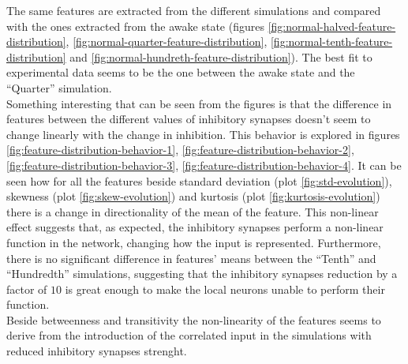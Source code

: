 The same features are extracted from the different simulations and compared with the ones extracted from the awake state (figures \ref{fig:normal-halved-feature-distribution}, \ref{fig:normal-quarter-feature-distribution}, \ref{fig:normal-tenth-feature-distribution} and \ref{fig:normal-hundreth-feature-distribution}).
The best fit to experimental data seems to be the one between the awake state and the ``Quarter'' simulation.\\
Something interesting that can be seen from the figures is that the difference in features between the different values of inhibitory synapses doesn't seem to change linearly with the change in inhibition.
This behavior is explored in figures \ref{fig:feature-distribution-behavior-1}, \ref{fig:feature-distribution-behavior-2}, \ref{fig:feature-distribution-behavior-3}, \ref{fig:feature-distribution-behavior-4}.
It can be seen how for all the features beside standard deviation (plot \ref{fig:std-evolution}), skewness (plot \ref{fig:skew-evolution}) and kurtosis (plot \ref{fig:kurtosis-evolution}) there is a change in directionality of the mean of the feature.
This non-linear effect suggests that, as expected, the inhibitory synapses perform a non-linear function in the network, changing how the input is represented.
Furthermore, there is no significant difference in features' means between the ``Tenth'' and ``Hundredth'' simulations, suggesting that the inhibitory synapses reduction by a factor of $10$ is great enough to make the local neurons unable to perform their function.\\
Beside betweenness and transitivity the non-linearity of the features seems to derive from the introduction of the correlated input in the simulations with reduced inhibitory synapses strenght.

